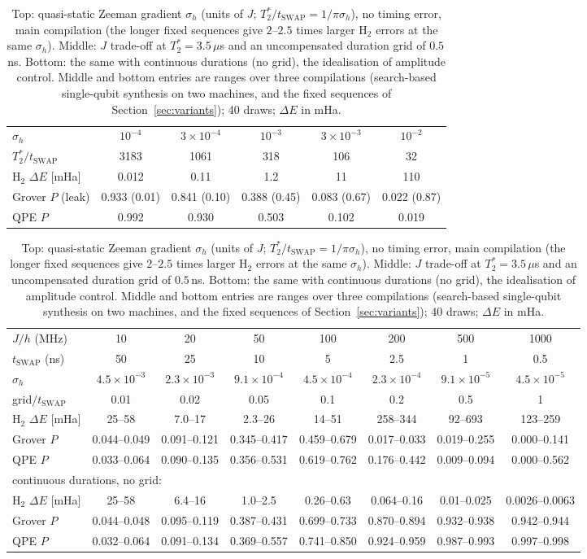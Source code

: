 \documentclass[reprint,aps,pra,amsmath,amssymb,superscriptaddress,letterpaper]{revtex4-2}
\newcommand{\Hz}{\mathrm{H}_2}
\newcommand{\tsw}{t_{\mathrm{SWAP}}}
\begin{document}
\begin{table}[t]
\centering\small
\caption{Top: quasi-static Zeeman gradient $\sigma_h$ (units of $J$; $T_2^*/\tsw =1/\pi\sigma_h$), no timing error, main compilation (the longer fixed sequences give $2$--$2.5$ times larger $\Hz$ errors at the same $\sigma_h$). Middle: $J$ trade-off at $T_2^*=3.5\,\mu$s and an uncompensated duration grid of $0.5$\,ns. Bottom: the same with continuous durations (no grid), the idealisation of amplitude control. Middle and bottom entries are ranges over three compilations (search-based single-qubit synthesis on two machines, and the fixed sequences of Section~\ref{sec:variants}); 40 draws; $\Delta E$ in mHa.}
\label{tab:deco}
\begin{tabular}{lccccc}
\toprule
$\sigma_h$ & $10^{-4}$ & $3\times10^{-4}$ & $10^{-3}$ & $3\times10^{-3}$ & $10^{-2}$\\
$T_2^*/\tsw$ & 3183 & 1061 & 318 & 106 & 32\\
\midrule
$\Hz$ $\Delta E$ [mHa] & 0.012 & 0.11 & 1.2 & 11 & 110\\
Grover $P$ (leak) & 0.933 (0.01) & 0.841 (0.10) & 0.388 (0.45) & 0.083 (0.67) & 0.022 (0.87)\\
QPE $P$ & 0.992 & 0.930 & 0.503 & 0.102 & 0.019\\
\bottomrule
\end{tabular}

\medskip
{\setlength{\tabcolsep}{3pt}\footnotesize
\begin{tabular}{lccccccc}
\toprule
$J/h$ (MHz) & 10 & 20 & 50 & 100 & 200 & 500 & 1000\\
$\tsw$ (ns) & 50 & 25 & 10 & 5 & 2.5 & 1 & 0.5\\
$\sigma_h$ & $4.5\times10^{-3}$ & $2.3\times10^{-3}$ & $9.1\times10^{-4}$ & $4.5\times10^{-4}$ & $2.3\times10^{-4}$ & $9.1\times10^{-5}$ & $4.5\times10^{-5}$\\
grid$/\tsw$ & 0.01 & 0.02 & 0.05 & 0.1 & 0.2 & 0.5 & 1\\
\midrule
$\Hz$ $\Delta E$ [mHa] & 25--58 & 7.0--17 & 2.3--26 & 14--51 & 258--344 & 92--693 & 123--259 \\
Grover $P$ & 0.044--0.049 & 0.091--0.121 & 0.345--0.417 & 0.459--0.679 & 0.017--0.033 & 0.019--0.255 & 0.000--0.141 \\
QPE $P$ & 0.033--0.064 & 0.090--0.135 & 0.356--0.531 & 0.619--0.762 & 0.176--0.442 & 0.009--0.094 & 0.000--0.562 \\
\midrule
\multicolumn{8}{l}{continuous durations, no grid:}\\
$\Hz$ $\Delta E$ [mHa] & 25--58 & 6.4--16 & 1.0--2.5 & 0.26--0.63 & 0.064--0.16 & 0.01--0.025 & 0.0026--0.0063 \\
Grover $P$ & 0.044--0.048 & 0.095--0.119 & 0.387--0.431 & 0.699--0.733 & 0.870--0.894 & 0.932--0.938 & 0.942--0.944 \\
QPE $P$ & 0.032--0.064 & 0.091--0.134 & 0.369--0.557 & 0.741--0.850 & 0.924--0.959 & 0.987--0.993 & 0.997--0.998 \\
\bottomrule
\end{tabular}}
\end{table}
\end{document}
